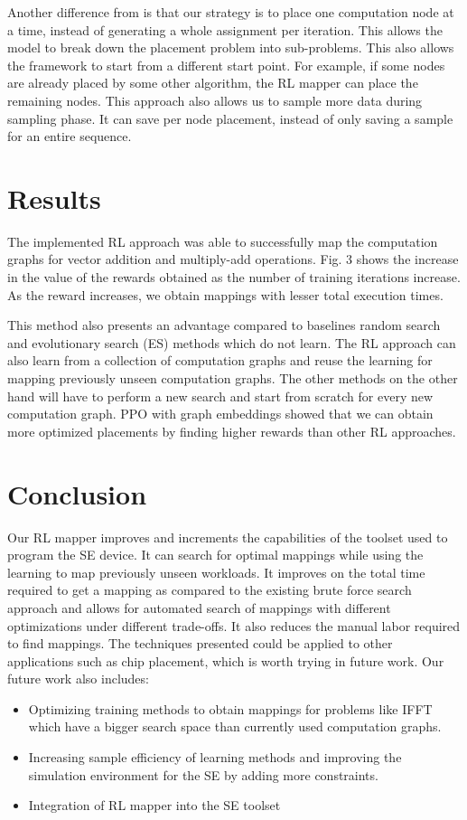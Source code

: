 \documentclass[sigplan,screen]{acmart}
\begin{document}
Another difference from \cite{zhou2019gdp}  is that our strategy is to place one computation node at a time, instead of generating a whole assignment per iteration. 
This allows the model to break down the placement problem into sub-problems. 
This also allows the framework to start from a different start point. For example, if some nodes are already placed by some other algorithm, the RL mapper can place the remaining nodes. 
This approach also allows us to sample more data during sampling phase. 
It can save per node placement, instead of only saving a sample for an entire sequence.  

\section{Results}

The implemented RL approach was able to successfully map the computation graphs for vector addition and multiply-add operations. 
Fig. 3 shows the increase in the value of the rewards obtained as the number of training iterations increase. 
As the reward increases, we obtain mappings with lesser total execution times. 

This method also presents an advantage compared to baselines random search and evolutionary search (ES) methods which do not learn. 
The RL approach can also learn from a collection of computation graphs and reuse the learning for mapping previously unseen computation graphs. 
The other methods on the other hand will have to perform a new search and start from scratch for every new computation graph. 
PPO with graph embeddings showed that we can obtain more optimized placements by finding higher rewards than other RL approaches. 


\section{Conclusion}

Our RL mapper improves and increments the capabilities of the toolset used to program the SE device. 
It can search for optimal mappings while using the learning to map previously unseen workloads. 
It improves on the total time required to get a mapping as compared to the existing brute force search approach and allows for automated search of mappings with different optimizations under different trade-offs. 
It also reduces the manual labor required to find mappings. 
The techniques presented could be applied to other applications such as chip placement, which is worth trying in future work. 
Our future work also includes: 
\begin{itemize}
\item Optimizing training methods to obtain mappings for problems like IFFT which have a bigger search space than currently used computation graphs. 
\item Increasing sample efficiency of learning methods and improving the simulation environment for the SE by adding more constraints. 
\item Integration of RL mapper into the SE toolset 
\end{itemize}
\end{document}

